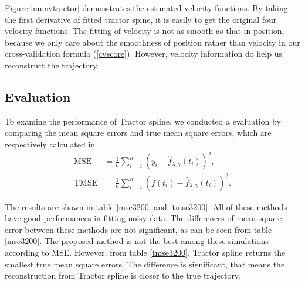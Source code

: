 Figure \ref{numvtractor} demonstrates the estimated velocity functions. By taking the first derivative of fitted tractor spine, it is easily to get the original four velocity functions. The fitting of velocity is not as smooth as that in position, because we only care about the smoothness of position rather than velocity in our cross-validation formula (\ref{cvscore}). However, velocity information do help us reconstruct the trajectory.



\subsection{Evaluation}
To examine the performance of Tractor spline, we conducted a evaluation by comparing the mean square errors and true mean square errors, which are respectively calculated in
\begin{align}
\mbox{MSE}&= \frac{1}{n} \sum_{i=1}^{n} (y_i-\hat{f}_{\lambda,\gamma}(t_i))^2,\\
\mbox{TMSE}&= \frac{1}{n} \sum_{i=1}^{n} (f(t_i)-\hat{f}_{\lambda,\gamma}(t_i))^2.
\end{align}



The results are shown in table \ref{mse3200} and \ref{tmse3200}. All of these methods have good performances in fitting noisy data. The differences of mean square error between these methods are not significant, as can be seen from table \ref{mse3200}. The proposed method is not the best among these simulations according to MSE. However, from table \ref{tmse3200}, Tractor spline returns the smallest true mean square errors. The difference is significant, that means the reconstruction from Tractor spline is closer to the true trajectory. 
 
